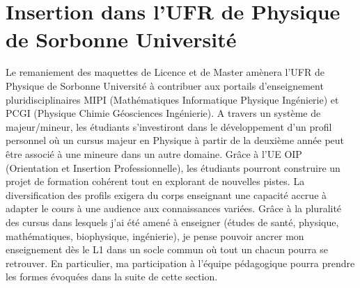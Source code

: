 \documentclass[12pt,onecolumn]{article}
\begin{document}
\vspace*{0.2cm}

\small

\noindent {}    \\
    \\
    \\
    \\ 
    \\ 
    \\ 
   \\ 

\normalsize 

\section*{Insertion dans l'UFR de Physique de Sorbonne Université}

\indent  \indent Le remaniement des maquettes de Licence et de Master amènera l'UFR de Physique de Sorbonne Université à contribuer aux portails d'enseignement pluridisciplinaires MIPI (Mathématiques Informatique Physique Ingénierie) et PCGI (Physique Chimie Géosciences Ingénierie). A travers un système de majeur/mineur, les étudiants s'investiront dans le développement d'un profil personnel où un cursus majeur en Physique à partir de la deuxième année peut être associé à une mineure dans un autre domaine. Grâce à l'UE OIP (Orientation et Insertion Professionnelle), les étudiants pourront construire un projet de formation cohérent tout en explorant de nouvelles pistes. La diversification des profils exigera du corps enseignant une capacité accrue à adapter le cours à une audience aux connaissances variées. Grâce à la pluralité des cursus dans lesquels j'ai été amené à enseigner (études de santé, physique, mathématiques, biophysique, ingénierie), je pense pouvoir ancrer mon enseignement dès le L1 dans un socle commun où tout un chacun pourra se retrouver. En particulier, ma participation à l'équipe pédagogique pourra prendre les formes évoquées dans la suite de cette section.\\
\end{document}
